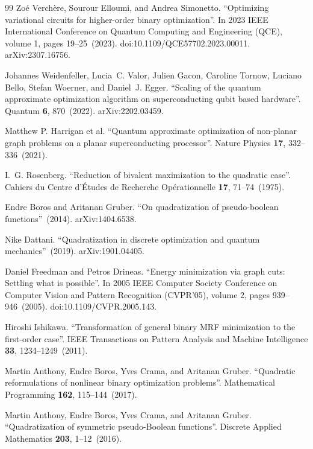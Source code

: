 \begin{thebibliography}{99}
Zo{\'e} Verch{\`e}re, Sourour Elloumi, and Andrea Simonetto.
\newblock ``Optimizing variational circuits for higher-order binary optimization''.
\newblock In 2023 IEEE International Conference on Quantum Computing and Engineering (QCE), volume 1, pages 19--25~(2023).
\newblock doi:10.1109/QCE57702.2023.00011.
\newblock arXiv:2307.16756.

Johannes Weidenfeller, Lucia~C. Valor, Julien Gacon, Caroline Tornow, Luciano Bello, Stefan Woerner, and Daniel~J. Egger.
\newblock ``Scaling of the quantum approximate optimization algorithm on superconducting qubit based hardware''.
\newblock Quantum {\bf 6}, 870~(2022).
\newblock arXiv:2202.03459.

Matthew P. Harrigan et al.
\newblock ``Quantum approximate optimization of non-planar graph problems on a planar superconducting processor''.
\newblock Nature Physics {\bf 17}, 332--336~(2021).


I.~G. Rosenberg.
\newblock ``Reduction of bivalent maximization to the quadratic case''.
\newblock Cahiers du Centre d'\'Etudes de Recherche Op\'erationnelle {\bf 17}, 71--74~(1975).

Endre Boros and Aritanan Gruber.
\newblock ``On quadratization of pseudo-boolean functions''~(2014).
\newblock arXiv:1404.6538.

Nike Dattani.
\newblock ``Quadratization in discrete optimization and quantum mechanics''~(2019).
\newblock arXiv:1901.04405.

Daniel Freedman and Petros Drineas.
\newblock ``Energy minimization via graph cuts: Settling what is possible''.
\newblock In 2005 IEEE Computer Society Conference on Computer Vision and Pattern Recognition (CVPR'05), volume 2, pages 939--946~(2005).
\newblock doi:10.1109/CVPR.2005.143.

Hiroshi Ishikawa.
\newblock ``Transformation of general binary MRF minimization to the first-order case''.
\newblock IEEE Transactions on Pattern Analysis and Machine Intelligence {\bf 33}, 1234--1249~(2011).

Martin Anthony, Endre Boros, Yves Crama, and Aritanan Gruber.
\newblock ``Quadratic reformulations of nonlinear binary optimization problems''.
\newblock Mathematical Programming {\bf 162}, 115--144~(2017).

Martin Anthony, Endre Boros, Yves Crama, and Aritanan Gruber.
\newblock ``Quadratization of symmetric pseudo-Boolean functions''.
\newblock Discrete Applied Mathematics {\bf 203}, 1--12~(2016).



\end{thebibliography}
